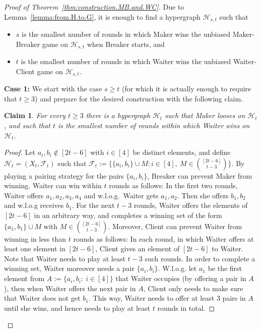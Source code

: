 \documentclass[reqno, 12pt]{amsart}
\numberwithin{equation}{section}
\numberwithin{figure}{section}
\newtheorem{claim}[theorem]{Claim}
\newcommand{\calH}{\mathcal{H}}
\newcommand{\calF}{\mathcal{F}}
\begin{document}
\begin{proof}[Proof of Theorem~\ref{thm:construction.MB.and.WC}]
Due to Lemma~\ref{lemma:from.H.to.G}, it is enough to find
a hypergraph $\calH_{s,t}$ such that
\begin{itemize}
\item[(i)] $s$ is the smallest number of rounds in which Maker wins the unbiased Maker-Breaker game on $\calH_{s,t}$ when Breaker starts, and
\item[(ii)] $t$ is the smallest number of rounds
in which Waiter wins the unbiased Waiter-Client game on $\calH_{s,t}$.
\end{itemize}

\textbf{Case 1:} We start with the case $s\geq t$ (for which it is actually enough to require that $t\geq 3$) and prepare for the desired construction 
with the following claim.

\begin{claim}\label{claim.WC.yes.MB.no}
For every $t\geq 3$ there is a hypergraph $\calH_{t}$
such that Maker looses on $\calH_t$,
and such that $t$ is the smallest number of rounds within which 
Waiter wins on $\calH_t$.
\end{claim}

\begin{proof}
Let $a_i,b_i\notin [2t-6]$ with $i\in [4]$ be distinct elements,
and define $\calH_t = (X_t,\calF_t)$ such that
$\calF_t := \{ \{a_i,b_i\}\cup M: i\in [4],~ M\in \binom{[2t-6]}{t-3} \}$.
By playing a pairing strategy for the pairs $\{a_i,b_i\}$,
Breaker can prevent Maker from winning.
Waiter can win within $t$ rounds as follows:
In the first two rounds, Waiter offers $a_1,a_2,a_3,a_4$
and w.l.o.g.~Waiter gets $a_1,a_2$.
Then she offers $b_1,b_2$ and w.l.o.g receives $b_1$.
For the next $t-3$ rounds, Waiter offers the elements of
$[2t-6]$ in an arbitrary way, and completes a winning set
of the form $\{a_1,b_1\}\cup M$ with 
$M\in \binom{[2t-6]}{t-3}$.
Moreover, Client can prevent Waiter from winning in less than $t$ rounds as follows: In each round, in which Waiter offers at least one element in $[2t-6]$, Client gives an element of $[2t-6]$ to Waiter. Note that Waiter needs to play at least $t-3$ such rounds.
In order to complete a winning set, Waiter moreover needs
a pair $\{a_i,b_i\}$. W.l.o.g. let $a_1$ be the first element from
$A:=\{a_i,b_i:~i\in [4]\}$ that Waiter occupies (by offering a pair in $A$), then when Waiter offers the next pair in $A$,
Client only needs to make sure that Waiter does not get $b_1$.
This way, Waiter needs to offer at least 3 pairs in $A$
until she wins, and hence needs to play at least $t$ rounds in total.
\end{proof}


\end{proof}
\end{document}
